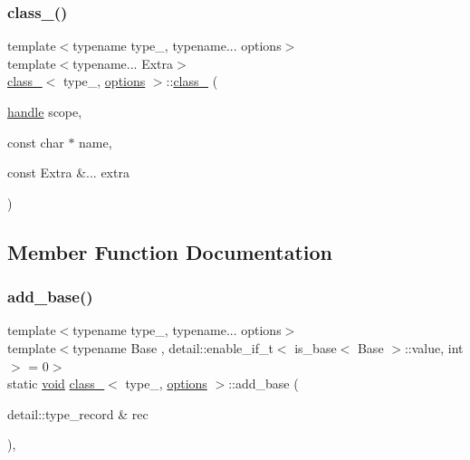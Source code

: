 \subsubsection{\texorpdfstring{class\_()}{class\_()}}
{\footnotesize\ttfamily template$<$typename type\+\_\+, typename... options$>$ \\
template$<$typename... Extra$>$ \\
\mbox{\hyperlink{classclass__}{class\+\_\+}}$<$ type\+\_\+, \mbox{\hyperlink{classoptions}{options}} $>$\+::\mbox{\hyperlink{classclass__}{class\+\_\+}} (\begin{DoxyParamCaption}\item[{\mbox{\hyperlink{classhandle}{handle}}}]{scope,  }\item[{const char $\ast$}]{name,  }\item[{const Extra \&...}]{extra }\end{DoxyParamCaption})\hspace{0.3cm}{\ttfamily [inline]}}



\subsection{Member Function Documentation}
\mbox{\label{classclass___a118815a833b1fe76c91536afdfc1f305}} 
\subsubsection{\texorpdfstring{add\_base()}{add\_base()}\hspace{0.1cm}{\footnotesize\ttfamily [1/2]}}
{\footnotesize\ttfamily template$<$typename type\+\_\+, typename... options$>$ \\
template$<$typename Base , detail\+::enable\+\_\+if\+\_\+t$<$ is\+\_\+base$<$ Base $>$\+::value, int $>$  = 0$>$ \\
static \mbox{\hyperlink{_s_d_l__opengles2__gl2ext_8h_ae5d8fa23ad07c48bb609509eae494c95}{void}} \mbox{\hyperlink{classclass__}{class\+\_\+}}$<$ type\+\_\+, \mbox{\hyperlink{classoptions}{options}} $>$\+::add\+\_\+base (\begin{DoxyParamCaption}\item[{detail\+::type\+\_\+record \&}]{rec }\end{DoxyParamCaption})\hspace{0.3cm}{\ttfamily [inline]}, {\ttfamily [static]}}

